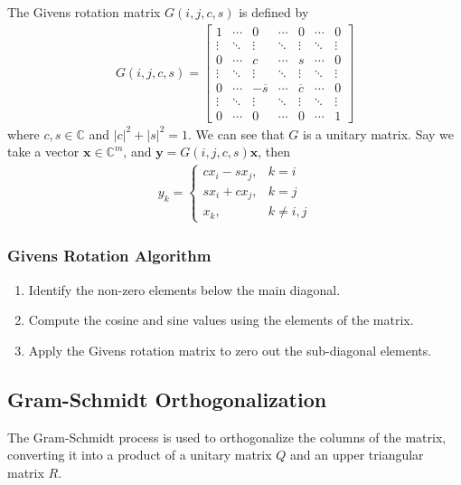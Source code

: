 \documentclass[12pt]{article}
\newcommand{\vecb}[1]{\mathbf{#1}}
\newcommand{\brak}[1]{\ensuremath{\left(#1\right)}}
\newcommand{\defvec}[2]{\vecb{#1}\in\mathbb{C}^{#2}}
\newcommand{\abs}[1]{\left\vert#1\right\vert}
\begin{document}
The Givens rotation matrix $G\brak{i, j, c, s}$ is defined by
\begin{align}
G\brak{i, j, c, s} = \begin{bmatrix}
1 & \cdots & 0 & \cdots & 0 & \cdots & 0 \\
\vdots & \ddots & \vdots & \ddots & \vdots & \ddots & \vdots \\
0 & \cdots & c & \cdots & s & \cdots & 0 \\
\vdots & \ddots & \vdots & \ddots & \vdots & \ddots & \vdots \\
0 & \cdots & -\overline{s} & \cdots & \overline{c} & \cdots & 0 \\
\vdots & \ddots & \vdots & \ddots & \vdots & \ddots & \vdots \\
0 & \cdots & 0 & \cdots & 0 & \cdots & 1
\end{bmatrix}
\end{align}
where $c, s \in \mathbb{C}$ and $\abs{c}^2 + \abs{s}^2 = 1$.
We can see that $G$ is a unitary matrix. 
\newline
Say we take a vector $\defvec{x}{m}$, and $\vecb{y} = G\brak{i, j, c, s}\vecb{x}$, then
\begin{align}
    y_k = \begin{cases}
        c x_i - s x_j, & k = i \\
        s x_i + c x_j, & k = j \\
        x_k, & k \neq i, j
    \end{cases}
\end{align}

\subsubsection{Givens Rotation Algorithm}
\begin{enumerate}
    \item Identify the non-zero elements below the main diagonal.
    \item Compute the cosine and sine values using the elements of the matrix.
    \item Apply the Givens rotation matrix to zero out the sub-diagonal elements.
\end{enumerate}

\subsection{Gram-Schmidt Orthogonalization}
The Gram-Schmidt process is used to orthogonalize the columns of the matrix, converting it into a product of a unitary matrix $Q$ and an upper triangular matrix $R$.
\end{document}
